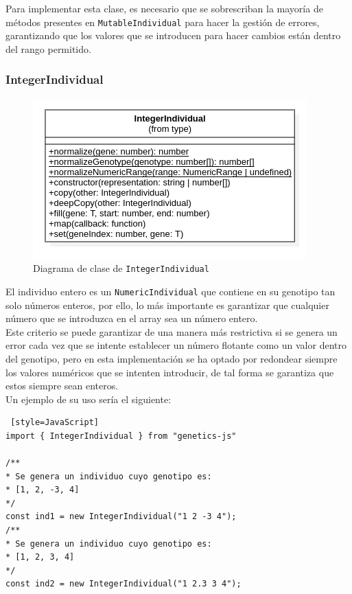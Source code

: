 Para implementar esta clase, es necesario que se sobrescriban la mayoría de métodos presentes en \texttt{MutableIndividual} para hacer la gestión de errores, garantizando que los valores que se introducen para hacer cambios están dentro del rango permitido.

\subsubsection{IntegerIndividual}

\begin{figure}[ht]
    \centering
    \includegraphics[scale=0.7]{mem/images/cap-4/4.2.2(Individuos)/IntegerIndividual.png}
    \caption{Diagrama de clase de \texttt{IntegerIndividual}}
    \label{fig:binaryindividual-uml}
\end{figure}

El individuo entero es un \texttt{NumericIndividual} que contiene en su genotipo tan solo números enteros, por ello, lo más importante es garantizar que cualquier número que se introduzca en el array sea un número entero. \\

Este criterio se puede garantizar de una manera más restrictiva si se genera un error cada vez que se intente establecer un número flotante como un valor dentro del genotipo, pero en esta implementación se ha optado por redondear siempre los valores numéricos que se intenten introducir, de tal forma se garantiza que estos siempre sean enteros. \\

Un ejemplo de su uso sería el siguiente: 

\begin{lstlisting} [style=JavaScript]
import { IntegerIndividual } from "genetics-js"

/**
* Se genera un individuo cuyo genotipo es:
* [1, 2, -3, 4]
*/
const ind1 = new IntegerIndividual("1 2 -3 4");
/**
* Se genera un individuo cuyo genotipo es:
* [1, 2, 3, 4]
*/
const ind2 = new IntegerIndividual("1 2.3 3 4");
\end{lstlisting}

